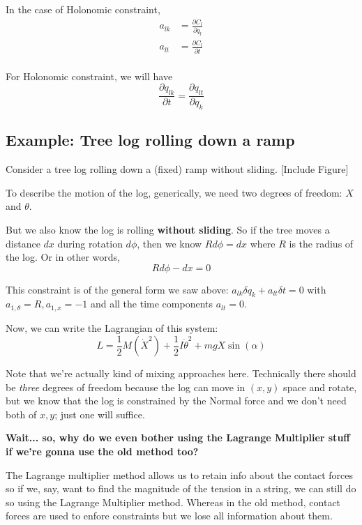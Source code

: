 \documentclass[11pt]{article}
\begin{document}
\begin{redbox}
  In the case of Holonomic constraint,
  \begin{align*}
    a_{lk} &= \frac{\partial C_l}{\partial q_{l}} \\
    a_{lt} &= \frac{\partial C_l}{\partial t} \\
  \end{align*}
\end{redbox}

\vskip 0.5cm
For Holonomic constraint, we will have 
\[ \frac{\partial q_{lk}}{\partial t} = \frac{\partial q_{lt}}{\partial q_{k}} \]








\subsection{Example: Tree log rolling down a ramp}

Consider a tree log rolling down a (fixed) ramp without sliding.
\vskip 0.5cm
[Include Figure]

\vskip 0.5cm
To describe the motion of the log, generically, we need two degrees of freedom: $X$ and $\theta$.

\vskip 0.5cm
But we also know the log is rolling \textbf{without sliding}. So if the tree moves a distance $dx$ during rotation $d\phi$, then we know $Rd\phi = dx$
where $R$ is the radius of the log. Or in other words,
\[ R d\phi - dx = 0 \]

\vskip 0.5cm
This constraint is of the general form we saw above: 
$ \boxed{a_{lk} \delta q_{k} + a_{lt} \delta t = 0 }$
with $a_{1,\theta} = R, a_{1, x} = -1$ and all the time components $a_{lt} = 0$.

\vskip 0.5cm
Now, we can write the Lagrangian of this system: 
\[ L = \frac{1}{2}M(\dot{X}^2) + \frac{1}{2}I \dot{\theta}^2 + mg X \sin(\alpha) \]

Note that we're actually kind of mixing approaches here. Technically there should be \emph{three} degrees of freedom because the log can move in $(x,y)$ space and rotate, but we know that the log is constrained by the Normal force and we don't need both of $x,y$; just one will suffice.

\begin{bluebox}
  \textbf{Wait... so, why do we even bother using the Lagrange Multiplier stuff if we're gonna use the old method too?} 

  \vskip 0.5cm
  The Lagrange multiplier method allows us to retain info about the contact forces so if we, say, want to find the magnitude of the tension in a string, we can still do so using the Lagrange Multiplier method. Whereas in the old method, contact forces are used to enfore constraints but we lose all information about them.
\end{bluebox}
\end{document}
